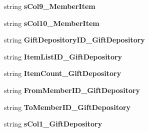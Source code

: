 \begin{DoxyCompactItemize}
\item 
string {\bfseries s\+Col9\+\_\+\+Member\+Item}\hypertarget{a00114_a191379e30dc7e305f8e97168b2365b7f}{}\label{a00114_a191379e30dc7e305f8e97168b2365b7f}

\item 
string {\bfseries s\+Col10\+\_\+\+Member\+Item}\hypertarget{a00114_a0714dddd7a5cd43ed1cfa5609d36dfd5}{}\label{a00114_a0714dddd7a5cd43ed1cfa5609d36dfd5}

\item 
string {\bfseries Gift\+Depository\+I\+D\+\_\+\+Gift\+Depository}\hypertarget{a00114_ac5c8843eb500b59a302d4fb6af9a835a}{}\label{a00114_ac5c8843eb500b59a302d4fb6af9a835a}

\item 
string {\bfseries Item\+List\+I\+D\+\_\+\+Gift\+Depository}\hypertarget{a00114_ada968463b84903804b54d72df8964eb9}{}\label{a00114_ada968463b84903804b54d72df8964eb9}

\item 
string {\bfseries Item\+Count\+\_\+\+Gift\+Depository}\hypertarget{a00114_ab8d87f2416d7b94ca786c3ee218200d3}{}\label{a00114_ab8d87f2416d7b94ca786c3ee218200d3}

\item 
string {\bfseries From\+Member\+I\+D\+\_\+\+Gift\+Depository}\hypertarget{a00114_a5f57e457076c4ab6bb1faa2e72234d91}{}\label{a00114_a5f57e457076c4ab6bb1faa2e72234d91}

\item 
string {\bfseries To\+Member\+I\+D\+\_\+\+Gift\+Depository}\hypertarget{a00114_a6d1752fd0b5952ff303a74bcbd015817}{}\label{a00114_a6d1752fd0b5952ff303a74bcbd015817}

\item 
string {\bfseries s\+Col1\+\_\+\+Gift\+Depository}\hypertarget{a00114_a9867e6a0c80cdb1642bc340dc8a4ec03}{}\label{a00114_a9867e6a0c80cdb1642bc340dc8a4ec03}


\end{DoxyCompactItemize}
